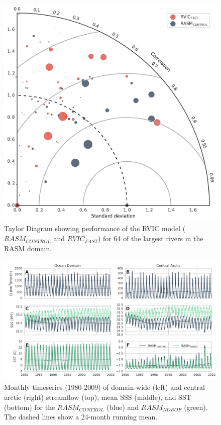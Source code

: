 \documentclass[jgrga, draft]{agutex}
\begin{document}
\clearpage
\begin{figure}
\noindent\includegraphics[width=40pc,natwidth=1]{R1010RBRbaaa01a_rvicfast_taylordiag}
\caption{Taylor Diagram showing performance of the RVIC model ($RASM_{CONTROL}$ and $RVIC_{FAST}$) for 64 of the largest rivers in the RASM domain.}
\label{fig:taylor}
\end{figure}

\clearpage
\begin{figure}
\noindent\includegraphics[width=40pc,natwidth=1]{ocean_combine_ts}
\caption{Monthly timeseries (1980-2009) of domain-wide (left) and central arctic (right) streamflow (top), mean SSS (middle), and SST (bottom) for the $RASM_{CONTROL}$ (blue) and $RASM_{NOROF}$ (green). The dashed lines show a 24-month running mean.}
\label{fig:ocean_timeseries}
\end{figure}
\end{document}
